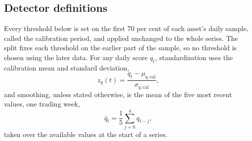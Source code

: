 \documentclass[pdflatex,sn-mathphys-num,iicol]{sn-jnl}
\begin{document}
\subsection{Detector definitions}
Every threshold below is set on the first 70 per cent of each asset's daily sample, called the calibration period, and applied unchanged to the whole series. The split fixes each threshold on the earlier part of the sample, so no threshold is chosen using the later data. For any daily score $q_t$, standardization uses the calibration mean and standard deviation,
\begin{equation}
z_q(t)=\frac{q_t-\mu_{q,\mathrm{cal}}}{\sigma_{q,\mathrm{cal}}},
\end{equation}
and smoothing, unless stated otherwise, is the mean of the five most recent values, one trading week,
\begin{equation}
\bar q_t=\frac{1}{5}\sum_{j=0}^{4}q_{t-j},
\end{equation}
taken over the available values at the start of a series.
\end{document}
